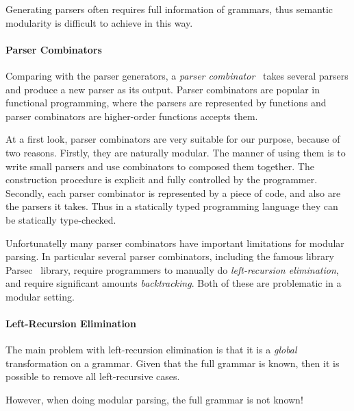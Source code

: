 Generating parsers often requires full information of grammars, thus semantic modularity is difficult to achieve in this way.


\paragraph{Parser Combinators}
Comparing with the parser generators, a \textit{parser combinator}~\cite{}
takes several parsers and produce a new parser as its output. Parser combinators are
popular in functional programming, where the parsers are represented
by functions and parser combinators are higher-order functions accepts
them.

At a first look, parser combinators are very suitable for our purpose, because of two
reasons. Firstly, they are naturally modular. The manner of using them
is to write small parsers and use combinators to composed them
together. The construction procedure is explicit and fully controlled
by the programmer. Secondly, each parser combinator is represented by
a piece of code, and also are the parsers it takes. Thus in a
statically typed programming language they can be statically
type-checked.

Unfortunatelly many parser combinators have important limitations for
modular parsing. In particular several parser combinators,
including the famous library Parsec~\cite{} library, require
programmers to manually do \textit{left-recursion elimination}, and
require significant amounts \textit{backtracking}. Both of these are
problematic in a modular setting.

\paragraph{Left-Recursion Elimination} The main problem with
left-recursion elimination is that it is a \emph{global}
transformation on a grammar. Given that the full grammar is known,
then it is possible to remove all left-recursive cases.

However, when doing modular parsing, the full grammar is not known!


